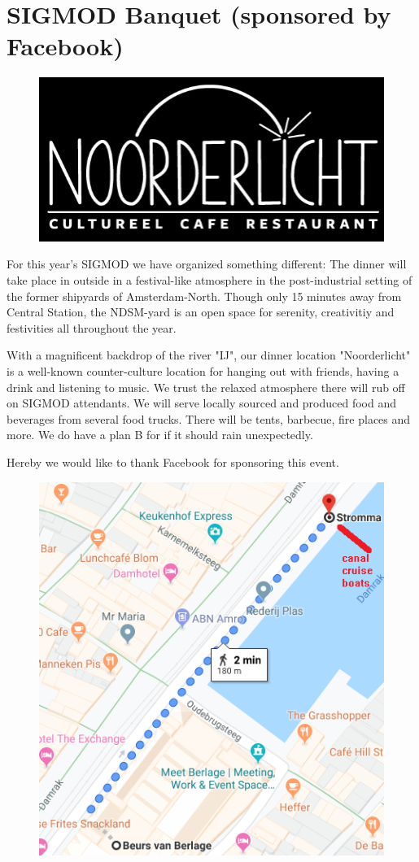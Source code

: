 
\section{SIGMOD Banquet (sponsored by Facebook)}

\begin{figure}[h]
\centering
\includegraphics[width=.5\textwidth]{images/noorderlicht.jpg}
\end{figure}

For this year's SIGMOD we have organized something different: The dinner will take place in outside in a festival-like atmosphere in the post-industrial setting of the former shipyards of Amsterdam-North. Though only 15 minutes away from Central Station, the NDSM-yard is an open space for serenity, creativitiy and festivities all throughout the year.

With a magnificent backdrop of the river "IJ", our dinner location "Noorderlicht" is a well-known counter-culture location for hanging out with friends, having a drink and listening to music. We trust the relaxed atmosphere there will rub off on SIGMOD attendants. We will serve locally sourced and produced food and beverages from several food trucks. There will be tents, barbecue, fire places and more. We do have a plan B for if it should rain unexpectedly.

Hereby we would like to thank Facebook for sponsoring this event.

\begin{figure}[h]
\centering
\includegraphics[width=.6\textwidth]{images/berlage-stromma.png}
\end{figure}

